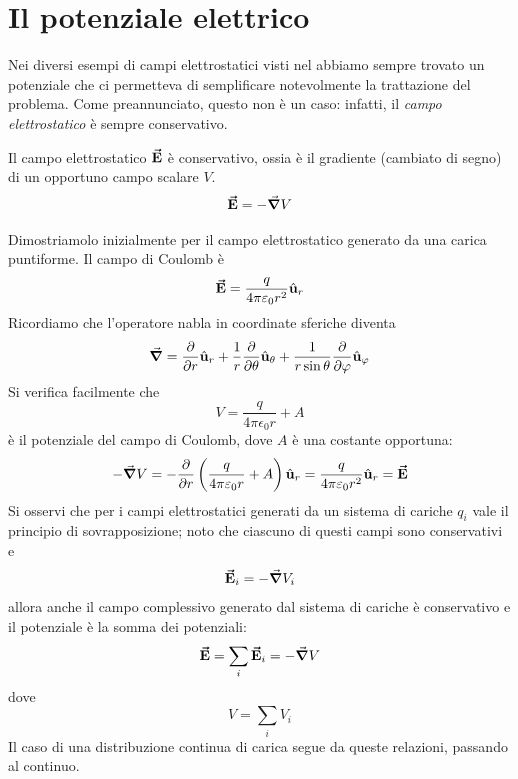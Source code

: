 \section{Il potenziale elettrico}
Nei diversi esempi di campi elettrostatici visti nel  abbiamo sempre trovato un potenziale che ci permetteva di semplificare notevolmente la trattazione del problema. Come preannunciato, questo non è un caso: infatti, il \textit{campo elettrostatico} è sempre conservativo.
\begin{theorema}
	Il campo elettrostatico $\vb*{\va{E}}$ è conservativo, ossia è il gradiente (cambiato di segno) di un opportuno campo scalare $V$.
	\begin{equation}
		\vb*{\va{E}}=-\grad{V}
	\end{equation}
\end{theorema}
\begin{demonstration}
	Dimostriamolo inizialmente per il campo elettrostatico generato da una carica puntiforme.
	Il campo di Coulomb è 
\begin{equation*}
	\vb*{\va{E}}=\frac{q}{4\pi\varepsilon_0r^2}\hat{\mathbf{u}}_r
\end{equation*}
Ricordiamo che l'operatore nabla in coordinate sferiche diventa
\begin{equation*}
	\grad =\pdv{r}\hat{\mathbf{u}}_r+\frac{1}{r}\pdv{\theta}\hat{\mathbf{u}}_\theta+\frac{1}{r\sin\theta}\pdv{\varphi}\hat{\mathbf{u}}_\varphi
\end{equation*}
Si verifica facilmente che
\begin{equation}
	V=\frac{q}{4\pi\epsilon_0r}+A\label{PotenzialeConst}
\end{equation}
è il potenziale del campo di Coulomb, dove $A$ è una costante opportuna:
\begin{equation*}
	-\grad{V}=-\pdv{r}\left(\frac{q}{4\pi\varepsilon_0r}+A\right)\hat{\mathbf{u}}_r=\frac{q}{4\pi\varepsilon_0r^2}\hat{\mathbf{u}}_r=\vb*{\va{E}}
\end{equation*}
Si osservi che per i campi elettrostatici generati da un sistema di cariche $q_i$ vale il principio di sovrapposizione; noto che ciascuno di questi campi sono conservativi e
\begin{equation*}
	\vb*{\va{E}}_i=-\grad{V}_i
\end{equation*}
allora anche il campo complessivo generato dal sistema di cariche è conservativo e il potenziale è la somma dei potenziali:
\begin{equation}
	\vb*{\va{E}}=\sum_i\vb*{\va{E}}_i=-\grad{V}
\end{equation}
dove
\begin{equation}
	V=\sum_iV_i
\end{equation}
Il caso di una distribuzione continua di carica segue da queste relazioni, passando al continuo.
\end{demonstration}\label{CondizionialContornoPot}
